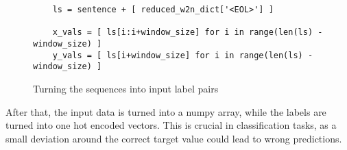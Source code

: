       \begin{figure}[htpb]
        \centering
        \begin{lstlisting}
    ls = sentence + [ reduced_w2n_dict['<EOL>'] ]
    
    x_vals = [ ls[i:i+window_size] for i in range(len(ls) - window_size) ]
    y_vals = [ ls[i+window_size] for i in range(len(ls) - window_size) ] \end{lstlisting}
        \caption{Turning the sequences into input label pairs}
        \label{fig:tosamples}
      \end{figure}

      After that, the input data is turned into a numpy array, while the labels are turned into one hot encoded vectors.
      This is crucial in classification tasks, as a small deviation around the correct target value could lead to
      wrong predictions.
